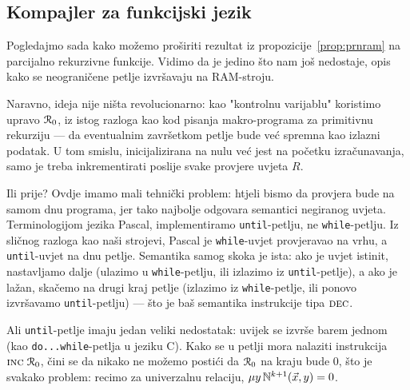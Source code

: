 
\subsection{Kompajler za funkcijski jezik}\label{sec:pir}

Pogledajmo sada kako možemo proširiti rezultat iz propozicije~\ref{prop:prnram} na parcijalno rekurzivne funkcije. Vidimo da je jedino što nam još nedostaje, opis kako se neograničene petlje izvršavaju na RAM-stroju.

Naravno, ideja nije ništa revolucionarno: kao "kontrolnu varijablu" koristimo upravo $\mathcal R_{0}$, iz istog razloga kao kod pisanja makro-programa za primitivnu rekurziju --- da eventualnim završetkom petlje bude već spremna kao izlazni podatak. U tom smislu, inicijalizirana na nulu već jest na početku izračunavanja, samo je treba inkrementirati poslije svake provjere uvjeta $R$.

Ili prije? Ovdje imamo mali tehnički problem: htjeli bismo da provjera bude na samom dnu programa, jer tako najbolje odgovara semantici negiranog uvjeta. Terminologijom jezika Pascal, implementiramo \texttt{until}-petlju, ne \texttt{while}-petlju. Iz sličnog razloga kao naši strojevi, Pascal je \texttt{while}-uvjet provjeravao na vrhu, a \texttt{until}-uvjet na dnu petlje. Semantika samog skoka je ista: ako je uvjet istinit, nastavljamo dalje (ulazimo u \texttt{while}-petlju, ili izlazimo iz \texttt{until}-petlje), a ako je lažan, skačemo na drugi kraj petlje (izlazimo iz \texttt{while}-petlje, ili ponovo izvršavamo \texttt{until}-petlju) --- što je baš semantika instrukcije tipa $\textsc{dec}$.

Ali \texttt{until}-petlje imaju jedan veliki nedostatak: uvijek se izvrše barem jednom (kao \texttt{do...while}-petlja u jeziku C). Kako se u petlji mora nalaziti instrukcija $\textsc{inc}\;\mathcal R_{0}$, čini se da nikako ne možemo postići da $\mathcal R_{0}$ na kraju bude $0$, što je svakako problem: recimo za univerzalnu relaciju, $\mu y\,{\mathbb N}^{k+1}(\vec x,y)=0$.

